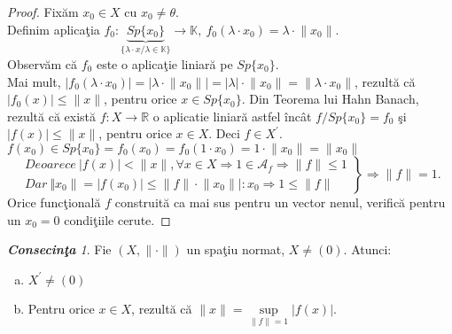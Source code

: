 \documentclass[ a4paper, 12pt]{report}
\theoremstyle{definition}
\theoremstyle{remark}
\newtheorem{cons}{\bf Consecin\c ta }[section]
\numberwithin{equation}{section}
\begin{document}
\begin{proof}
Fix\u am $x_0 \in X$ cu $x_0 \neq \theta.$\\
Definim aplica\c tia $f_0 : \underbrace{Sp\{x_0\}}_{\{ \lambda \cdot x / \lambda \in \mathbb{K} \}} \rightarrow \mathbb{K},\  f_0(\lambda \cdot x_0) = \lambda \cdot \lVert x_0 \rVert. $\\
Observ\u am c\u a $f_0$ este o aplica\c tie liniar\u a pe $Sp\{ x_0 \}.$\\
Mai mult, $\lvert f_0(\lambda \cdot x_0) \rvert = \lvert \lambda \cdot \lVert x_0 \rVert \rvert = \lvert \lambda \rvert \cdot \lVert x_0  \rVert = \lVert \lambda \cdot x_0 \rVert$, rezult\u a c\u a $\lvert f_0(x) \rvert \leq \lVert x \rVert$, pentru orice $x \in Sp\{x_0\}$. Din Teorema lui Hahn Banach, rezult\u a c\u a  exist\u a  $f : X \rightarrow \mathbb{R}$ o aplicatie liniar\u a astfel \^inc\^at $f/Sp\{x_0\} = f_0$ \c si $\lvert f(x) \rvert \leq \lVert x \rVert$, pentru orice $x \in X$. Deci $f \in X^{'}.$\\
$f(x_0) \in Sp\{x_0\} = f_0(x_0) = f_0(1 \cdot x_0) = 1 \cdot \lVert x_0 \rVert = \lVert x_0 \rVert$\\
\begin{equation*}
  \left.\begin{aligned}
         Deoarece\  \lvert f(x) \rvert < \lVert x \rVert, \forall x \in X \Rightarrow 1 \in \mathcal{A}_{f} \Rightarrow \lVert f \rVert \leq 1\\
        Dar\   \Vert x_0 \rVert = \lvert f(x_0) \rvert \leq \lVert f \rVert \cdot \lVert x_0 \rVert|:x_0 \Rightarrow 1 \leq \lVert f \rVert
        \end{aligned}
  \right\}
  \mbox{$\Rightarrow \lVert f \rVert = 1.$}
 \end{equation*}
Orice func\c tional\u a $f$ construit\u a ca mai sus pentru un vector nenul, verific\u a pentru un $x_0 = 0$ condi\c tiile cerute.
\end{proof}
\begin{cons}\label{c121}
Fie $(X,\lVert \cdot \rVert)$ un spa\c tiu normat, $X \neq (0)$. Atunci:
\begin{enumerate}[(a)]
\item $X^{'} \neq (0)$
\item Pentru orice $x \in X$, rezult\u a c\u a $\lVert x \rVert = \sup\limits_{\lVert f \rVert = 1}\lvert f(x) \rvert$.
\end{enumerate}
\end{cons}
\end{document}
